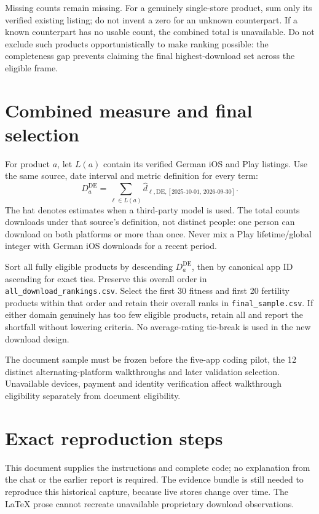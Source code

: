 \documentclass[10pt,a4paper]{article}
\begin{document}
Missing counts remain missing. For a genuinely single-store product, sum only its
verified existing listing; do not invent a zero for an unknown counterpart. If a
known counterpart has no usable count, the combined total is unavailable. Do not
exclude such products opportunistically to make ranking possible: the completeness
gap prevents claiming the final highest-download set across the eligible frame.

\section{Combined measure and final selection}
For product $a$, let $L(a)$ contain its verified German iOS and Play listings.
Use the same source, date interval and metric definition for every term:
\[
D_a^{\mathrm{DE}} = \sum_{\ell\in L(a)}
\widehat d_{\ell,\mathrm{DE},[2025\text{-}10\text{-}01,\,2026\text{-}09\text{-}30]}.
\]
The hat denotes estimates when a third-party model is used. The total counts
downloads under that source's definition, not distinct people: one person can
download on both platforms or more than once. Never mix a Play lifetime/global
integer with German iOS downloads for a recent period.

Sort all fully eligible products by descending $D_a^{\mathrm{DE}}$, then by
canonical app ID ascending for exact ties. Preserve this overall order in
\texttt{all\_download\_rankings.csv}. Select the first 30 fitness and first
20 fertility products within that order and retain their overall ranks in
\texttt{final\_sample.csv}. If either domain genuinely has too few eligible
products, retain all and report the shortfall without lowering criteria.
No average-rating tie-break is used in the new download design.

The document sample must be frozen before the five-app coding pilot, the
12 distinct alternating-platform walkthroughs and later validation selection.
Unavailable devices, payment and identity verification affect walkthrough
eligibility separately from document eligibility.

\section{Exact reproduction steps}
This document supplies the instructions and complete code; no explanation from
the chat or the earlier report is required. The evidence bundle is still needed
to reproduce this historical capture, because live stores change over time.
The LaTeX prose cannot recreate unavailable proprietary download observations.
\end{document}
